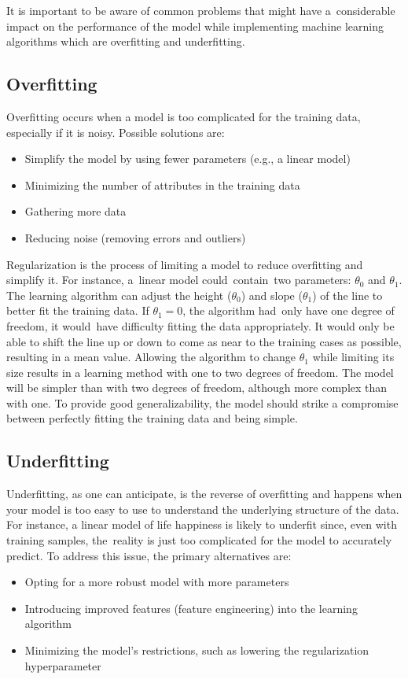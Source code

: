     
    It is important to be aware of common problems that might have a considerable impact on the performance of the model while implementing machine learning algorithms which are overfitting and underfitting.
    
    \subsection{Overfitting}

Overfitting occurs when a model is too complicated for the training data, especially if it is noisy. Possible solutions are:

\begin{itemize}
    \item Simplify the model by using fewer parameters (e.g., a linear model)
\item Minimizing the number of attributes in the training data
\item Gathering more data
\item Reducing noise (removing errors and outliers)
\end{itemize}


Regularization is the process of limiting a model to reduce overfitting and simplify it. For instance, a linear model could contain two parameters: $\theta_{0}$ and $\theta_{1}$. The learning algorithm can adjust the height ($\theta_{0}$) and slope ($\theta_{1}$) of the line to better fit the training data. If $\theta_{1} = 0$, the algorithm had only have one degree of freedom, it would have difficulty fitting the data appropriately. It would only be able to shift the line up or down to come as near to the training cases as possible, resulting in a mean value. Allowing the algorithm to change $\theta_{1}$ while limiting its size results in a learning method with one to two degrees of freedom. The model will be simpler than with two degrees of freedom, although more complex than with one. To provide good generalizability, the model should strike a compromise between perfectly fitting the training data and being simple.

\subsection{Underfitting}
Underfitting, as one can anticipate, is the reverse of overfitting and happens when your model is too easy to use to understand the underlying structure of the data. For instance, a linear model of life happiness is likely to underfit since, even with training samples, the reality is just too complicated for the model to accurately predict.
To address this issue, the primary alternatives are:
\begin{itemize}
\item Opting for a more robust model with more parameters
\item Introducing improved features (feature engineering) into the learning algorithm
\item Minimizing the model's restrictions, such as lowering the regularization hyperparameter
\end{itemize}

